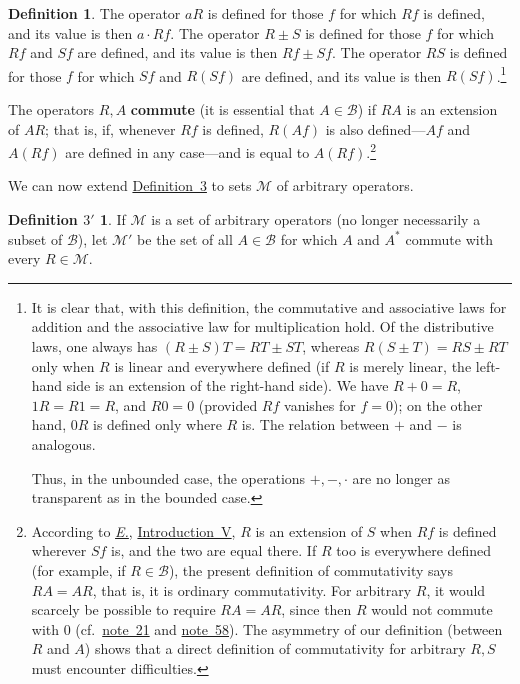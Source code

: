 \documentclass[
  paper=b5,
  twoside=true,
  fontsize=13pt,
  headings=normal,
  bookmarkpackage=false
]{scrartcl}
\theoremstyle{definition}
\newtheorem{definition}{Definition}
\newtheorem*{definitionprime}{Definition \(3'\)}
\newcommand{\NoteRef}[1]{\hyperref[fn:#1]{note~#1}}
\newcommand{\DefinitionRef}[1]{\hyperref[def:#1]{Definition~#1}}
\newcommand{\Eref}{\hyperref[fn:E-paper]{\emph{E.}}}
\newcommand{\ErefText}[1]{\href{https://doi.org/10.1007/BF01782338}{#1}}
\begin{document}
\begin{definition}\label{def:5-operations}
The operator \(aR\) is defined for those \(f\) for which \(Rf\) is
defined, and its value is then \(a\cdot Rf\).  The operator \(R\pm S\)
is defined for those \(f\) for which \(Rf\) and \(Sf\) are defined, and
its value is then \(Rf\pm Sf\).  The operator \(RS\) is defined for
those \(f\) for which \(Sf\) and \(R(Sf)\) are defined, and its value is
then \(R(Sf)\).\footnote{\label{fn:58}It is clear that, with this definition, the
commutative and associative laws for addition and the associative law
for multiplication hold.  Of the distributive laws, one always has
\((R\pm S)T=RT\pm ST\), whereas \(R(S\pm T)=RS\pm RT\) only when
\(R\) is linear and everywhere defined (if \(R\) is merely linear, the
left-hand side is an extension of the right-hand side).  We have
\(R+0=R\), \(1R=R1=R\), and \(R0=0\) (provided \(Rf\) vanishes for
\(f=0\)); on the other hand, \(0R\) is defined only where \(R\) is.
The relation between \(+\) and \(-\) is analogous.

Thus, in the unbounded case, the operations \(+,-,\cdot\) are no longer as
transparent as in the bounded case.}
\end{definition}

The operators \(R,A\) \textbf{commute} (it is essential that
\(A\in\mathcal B\)) if \(RA\) is an extension of \(AR\); that is, if,
whenever \(Rf\) is defined, \(R(Af)\) is also defined---\(Af\) and
\(A(Rf)\) are defined in any case---and is equal to \(A(Rf)\).\footnote{\label{fn:59}
According to \Eref, \ErefText{Introduction~V}, \(R\) is an extension of \(S\)
when \(Rf\) is defined wherever \(Sf\) is, and the two are equal there.
If \(R\) too is everywhere defined (for example, if \(R\in\mathcal B\)),
the present definition of commutativity says \(RA=AR\), that is, it is
ordinary commutativity.  For arbitrary \(R\), it would scarcely be
possible to require \(RA=AR\), since then \(R\) would not commute with
\(0\) (cf.\ \NoteRef{21} and \NoteRef{58}).  The asymmetry of our definition
(between \(R\) and \(A\)) shows that a direct definition of
commutativity for arbitrary \(R,S\) must encounter difficulties.}

We can now extend \DefinitionRef{3} to sets \(\mathcal M\) of arbitrary
operators.

\begin{definitionprime}\label{def:3-prime}
If \(\mathcal M\) is a set of arbitrary operators (no longer necessarily
a subset of \(\mathcal B\)), let \(\mathcal M'\) be the set of all
\(A\in\mathcal B\) for which \(A\) and \(A^*\) commute with every
\(R\in\mathcal M\).
\end{definitionprime}
\end{document}
